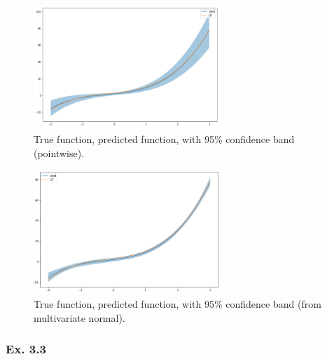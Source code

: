\documentclass{article}
\begin{document}
\begin{figure}[ht]
 \centering
  \includegraphics[width=200pt]{images/ex_3_2_a.png}
 \caption{True function, predicted function, with 95\% confidence band (pointwise).}
\end{figure}

\begin{figure}[ht]
 \centering
  \includegraphics[width=200pt]{images/ex_3_2_b.png}
 \caption{True function, predicted function, with 95\% confidence band (from multivariate normal).}
\end{figure}

\subsubsection{Ex. 3.3}
\end{document}
